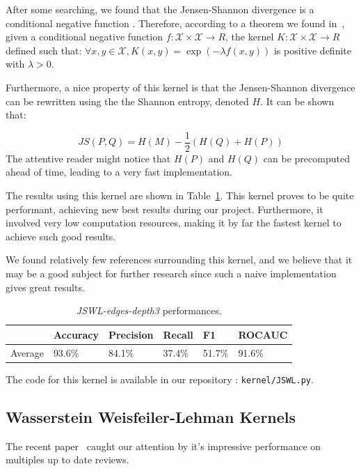 \documentclass{IEEEtran}
\begin{document}
After some searching, we found that the Jensen-Shannon divergence is a conditional negative function \cite{callut2011sequence}.
Therefore, according to a theorem we found in~\cite{callut2011sequence},
given a conditional negative function $ f : \mathcal{X} \times \mathcal{X} \to R$,
the kernel $K : \mathcal{X} \times \mathcal{X} \to R$ defined such that:
$\forall x, y \in \mathcal{X}, K(x, y) = \exp{(- \lambda f(x,y))}$
is positive definite with $\lambda > 0$.

Furthermore, a nice property of this kernel is
that the Jensen-Shannon divergence can be rewritten using the
the Shannon entropy, denoted $H$. It can be shown that:

\begin{equation*}
    JS(P, Q) = H(M) - \frac{1}{2} \left( H(Q) + H(P) \right)
\end{equation*}
The attentive reader might notice that
$H(P)$ and $H(Q)$ can be precomputed ahead of time,
leading to a very fast implementation.

The results using this kernel are shown in Table~\ref{tab:jswl}. This kernel proves to be quite performant, achieving new best results during our project. Furthermore, it involved very low computation resources, making it by far the fastest kernel to achieve such good results.

We found relatively few references surrounding this kernel, and we believe that it may be a good subject for further research since such a naive implementation gives great results.
\begin{table}[h]
    \centering
    \begin{tabular}{l|llll|l}
                & Accuracy & Precision & Recall & F1     & ROCAUC \\
        \hline
        Average & 93.6\%   & 84.1\%    & 37.4\% & 51.7\% & 91.6\% \\
    \end{tabular}
    \caption{\emph{JSWL-edges-depth3} performances.}
    \label{tab:jswl}
\end{table}

The code for this kernel is available in our repository : \texttt{kernel/JSWL.py}.

\subsection{Wasserstein Weisfeiler-Lehman Kernels}

The recent paper~\cite{togninalli2019wasserstein}
caught our attention by it's impressive performance
on multiples up to date reviews.
\end{document}

